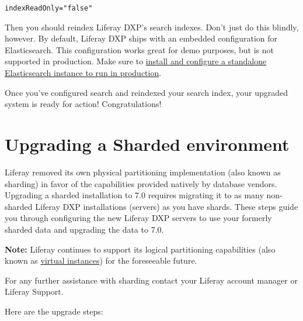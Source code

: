 \begin{verbatim}
indexReadOnly="false"
\end{verbatim}

Then you should reindex Liferay DXP's search indexes. Don't just do this
blindly, however. By default, Liferay DXP ships with an embedded
configuration for Elasticsearch. This configuration works great for demo
purposes, but is not supported in production. Make sure to
\href{/docs/7-0/deploy/-/knowledge_base/d/installing-elasticsearch}{install
and configure a standalone Elasticsearch instance to run in production}.

Once you've configured search and reindexed your search index, your
upgraded system is ready for action! Congratulations!

\section{Upgrading a Sharded
environment}\label{upgrading-a-sharded-environment}

Liferay removed its own physical partitioning implementation (also known
as sharding) in favor of the capabilities provided natively by database
vendors. Upgrading a sharded installation to 7.0 requires migrating it
to as many non-sharded Liferay DXP installations (servers) as you have
shards. These steps guide you through configuring the new Liferay DXP
servers to use your formerly sharded data and upgrading the data to 7.0.

\noindent\hrulefill

\textbf{Note:} Liferay continues to support its logical partitioning
capabilities (also known as
\href{/docs/7-0/user/-/knowledge_base/u/setting-up-a-liferay-instance}{virtual
instances}) for the foreseeable future.

\noindent\hrulefill

\noindent\hrulefill

For any further assistance with sharding contact your Liferay account
manager or Liferay Support.

\noindent\hrulefill

Here are the upgrade steps:

